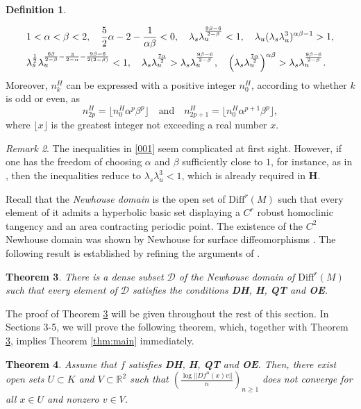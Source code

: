 \documentclass{amsart}
\theoremstyle{plain}
\newtheorem{thm}{Theorem}[section]
\theoremstyle{definition}
\newtheorem{dfn}[thm]{Definition}
\theoremstyle{remark}
\newtheorem{remark}[thm]{Remark}
\numberwithin{equation}{section}
\begin{document}
\begin{dfn}
\begin{itemize}
\begin{align}
\begin{split}
&1<\alpha <\beta<2,
\quad \dfrac{5}{2}\alpha-2-\frac{1}{\alpha\beta}<0,\quad
\lambda_s\lambda_u^{ \frac{9\beta-6}{2-\beta}}<1,\quad 
\lambda_u(\lambda_s\lambda_u^3)^{\alpha\beta-1} >1, \\
&\lambda_s ^{\frac{1}{2}}\lambda_u ^{\frac{6\beta}{2-\beta}-\frac{3}{2-\alpha}-\frac{9\beta-6}{2(2-\beta)}}<1, \quad
\lambda_s\lambda_u^{\frac{7\alpha}{2}}
>
\lambda_s\lambda_u^{\frac{9\beta-6}{2-\beta}},
\quad
\Bigl(\lambda_s\lambda_u^{\frac{7\alpha}{2}}\Bigr)^{\alpha\beta}
>
\lambda_s\lambda_u^{\frac{9\beta-6}{2-\beta}}.
\end{split}
\end{align}
Moreover, $n_k^H$ can be expressed with a positive integer $n_0^H$, according to whether $k$ is odd or even, as
\[
n_{2p}^H=\lfloor n_0^H \alpha^p\beta^p\rfloor  \quad \text{and} \quad n_{2p+1}^H=\lfloor n_0^H \alpha^{p+1}\beta^p\rfloor, 
\]
where $\lfloor x\rfloor$ is the greatest integer not exceeding a real number $x$.
\end{itemize}
\end{dfn}
\begin{remark}\label{rmk:0307}
The inequalities in \eqref{001} seem complicated at first sight. 
However, if one has the freedom of choosing $\alpha$ and $\beta$ sufficiently close to $1$, for instance, as in \cite{KLNS2022r}, then the inequalities reduce to ${\lambda}_s{\lambda}_u^3<1$, which is already required in {\bf H}.
\end{remark}


Recall that the \emph{Newhouse domain} is the open set of $\mbox{Diff}^r(M)$ such that every element of it admits a hyperbolic basic set displaying a $C^r$ robust homoclinic tangency and an area contracting periodic point. The existence of the $C^2$ Newhouse domain was shown by Newhouse for surface diffeomorphisms \cite{N1970, N1974}.   
The following result is established by refining the arguments of \cite[Theorem A]{KS2017}.
\begin{thm}\label{thm:KS}
There is a dense subset $\mathcal D$ of the Newhouse domain of $\mathrm{Diff}^r(M)$ such that every element of $\mathcal D$ satisfies the conditions {\bf DH}, {\bf H}, {\bf QT} and {\bf OE}.
\end{thm}

The proof of Theorem \ref{thm:KS} will be given throughout the rest of this section.
In Sections 3-5, we will prove the following theorem, which, together with Theorem \ref{thm:KS}, implies Theorem \ref{thm:main} immediately.
\begin{thm}\label{thm:main2}
Assume that $f$ satisfies {\bf DH}, {\bf H}, {\bf QT} and {\bf OE}. Then, there exist open sets $U\subset K$ and  $V\subset \mathbb R^2$ such that  %
$( \frac{\log ||Df^n(x)v||}{n})_{n\ge 1}$ does not converge
for all $x\in U$ and nonzero $v\in V$.
\end{thm}
\end{document}
